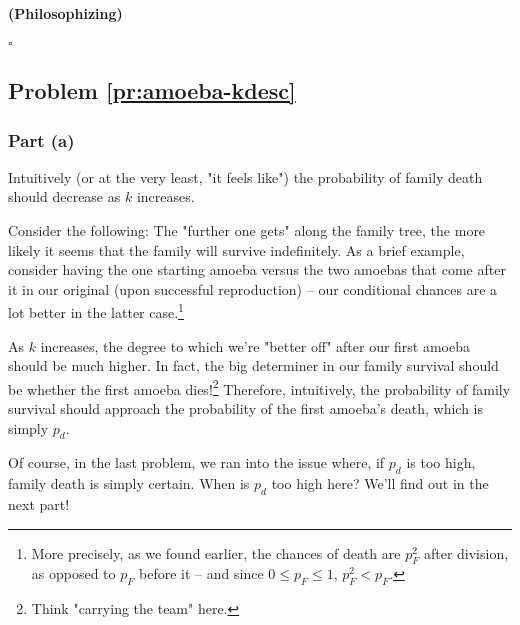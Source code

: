 \paragraph{(Philosophizing)}





$\square$


\subsection{Problem \ref{pr:amoeba-kdesc}}

\subsubsection{Part (a)}

Intuitively (or at the very least, "it feels like") the probability of family death should decrease as $k$ increases.

Consider the following: The "further one gets" along the family tree, the more likely it seems that the family will survive indefinitely. As a brief example, consider having the one starting amoeba versus the two amoebas that come after it in our original (upon successful reproduction) -- our conditional chances are a lot better in the latter case.\footnote{More precisely, as we found earlier, the chances of death are $p_F^2$ after division, as opposed to $p_F$ before it -- and since $0 \leq p_F \leq 1$, $p_F^2 < p_F$.}

As $k$ increases, the degree to which we're "better off" after our first amoeba should be much higher. In fact, the big determiner in our family survival should be whether the first amoeba dies!\footnote{Think "carrying the team" here.} Therefore, intuitively, the probability of family survival should approach the probability of the first amoeba's death, which is simply $p_d$. 

Of course, in the last problem, we ran into the issue where, if $p_d$ is too high, family death is simply certain. When is $p_d$ too high here? We'll find out in the next part!

